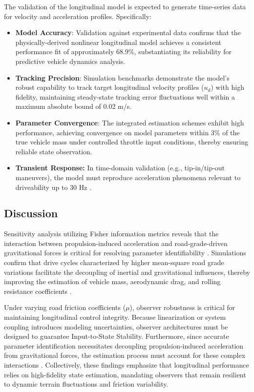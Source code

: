 \documentclass{article}
\begin{document}
The validation of the longitudinal model is expected to generate time-series data for velocity and acceleration profiles. Specifically:
\begin{itemize}
\item 

\textbf{Model Accuracy}: Validation against experimental data confirms that the physically-derived nonlinear longitudinal model achieves a consistent performance fit of approximately 68.9\%, substantiating its reliability for predictive vehicle dynamics analysis.\item 

\textbf{Tracking Precision}: Simulation benchmarks demonstrate the model's robust capability to track target longitudinal velocity profiles ($u_d$) with high fidelity, maintaining steady-state tracking error fluctuations well within a maximum absolute bound of 0.02 m/s.\item 

\textbf{Parameter Convergence}: The integrated estimation schemes exhibit high performance, achieving convergence on model parameters within 3\% of the true vehicle mass under controlled throttle input conditions, thereby ensuring reliable state observation.\item 

\textbf{Transient Response:} In time-domain validation (e.g., tip-in/tip-out maneuvers), the model must reproduce acceleration phenomena relevant to driveability up to 30 Hz  \parencite{luca_castellazzi_c04b8f1a}.
\end{itemize}
\subsection{Discussion}

Sensitivity analysis utilizing Fisher information metrics reveals that the interaction between propulsion-induced acceleration and road-grade-driven gravitational forces is critical for resolving parameter identifiability  \parencite{aaron_kandel_1d1d52c8}. Simulations confirm that drive cycles characterized by higher mean-square road grade variations facilitate the decoupling of inertial and gravitational influences, thereby improving the estimation of vehicle mass, aerodynamic drag, and rolling resistance coefficients  \parencite{aaron_kandel_1d1d52c8}.

Under varying road friction coefficients ($\mu$), observer robustness is critical for maintaining longitudinal control integrity. Because linearization or system coupling introduces modeling uncertainties, observer architectures must be designed to guarantee Input-to-State Stability. Furthermore, since accurate parameter identification necessitates decoupling propulsion-induced acceleration from gravitational forces, the estimation process must account for these complex interactions  \parencite{aaron_kandel_1d1d52c8}. Collectively, these findings emphasize that longitudinal performance relies on high-fidelity state estimation, mandating observers that remain resilient to dynamic terrain fluctuations and friction variability.
\end{document}
